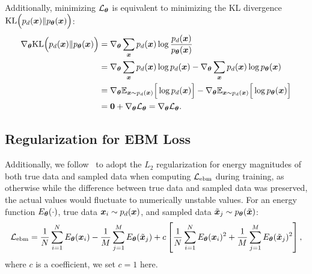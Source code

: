 Additionally, minimizing $\mathcal{L}_{{\bm{\theta}}}$ is equivalent to minimizing the KL divergence $\mathrm{KL} \Big( p_d({\bm{x}}) \| p_{{\bm{\theta}}}({\bm{x}}) \Big)$:
\begin{equation*}
\begin{aligned}
    \nabla_{{\bm{\theta}}} \mathrm{KL}\Big( p_d({\bm{x}}) \| p_{{\bm{\theta}}}({\bm{x}}) \Big) 
    &= \nabla_{{\bm{\theta}}} \sum_{{\bm{x}}} p_d({\bm{x}}) \log \frac{p_d({\bm{x}})}{p_{{\bm{\theta}}}({\bm{x}})} \\
    &= \nabla_{{\bm{\theta}}} \sum_{{\bm{x}}} p_d({\bm{x}}) \log p_d({\bm{x}}) - \nabla_{{\bm{\theta}}} \sum_{{\bm{x}}} p_d({\bm{x}}) \log p_{{\bm{\theta}}}({\bm{x}}) \\
    &= \nabla_{{\bm{\theta}}} {\mathbb{E}}_{{\bm{x}}\sim p_d({\bm{x}})}\Big[ \log p_d({\bm{x}}) \Big] - \nabla_{{\bm{\theta}}} {\mathbb{E}}_{{\bm{x}}\sim p_d({\bm{x}})}\Big[ \log p_{{\bm{\theta}}}({\bm{x}}) \Big] \\
    &= \bm{0} + \nabla_{{\bm{\theta}}} \mathcal{L}_{{\bm{\theta}}} = \nabla_{{\bm{\theta}}} \mathcal{L}_{{\bm{\theta}}}.
\end{aligned}
\end{equation*}


\subsection{Regularization for EBM Loss}
Additionally, we follow~\citep{du2019implicit} to adopt the $L_2$ regularization for energy magnitudes of both true data and sampled data when computing $\mathcal{L}_{\text{ebm}}$ during training, 
as otherwise while the difference between true data and sampled data was preserved, the actual values would fluctuate to numerically unstable values.
For an energy function $E_{{\bm{\theta}}}(\cdot)$, true data ${\bm{x}}_i\sim p_d({\bm{x}})$, and sampled data $\Tilde{{\bm{x}}}_j\sim p_{{\bm{\theta}}}(\Tilde{{\bm{x}}})$:
\begin{equation*}
\begin{aligned}
    \mathcal{L}_{\text{ebm}} = \frac{1}{N}\sum_{i=1}^{N} E_{{\bm{\theta}}}({\bm{x}}_i) - \frac{1}{M}\sum_{j=1}^{M} E_{{\bm{\theta}}}(\Tilde{{\bm{x}}}_j) + c \left[ \frac{1}{N}\sum_{i=1}^{N} E_{{\bm{\theta}}}({\bm{x}}_i)^2 + \frac{1}{M}\sum_{j=1}^{M} E_{{\bm{\theta}}}(\Tilde{{\bm{x}}}_j)^2 \right], 
\end{aligned}
\end{equation*}
where $c$ is a coefficient, we set $c = 1$ here. 

